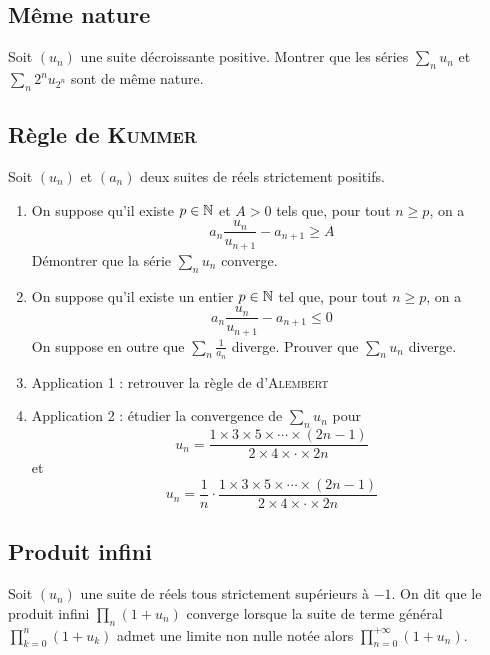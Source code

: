 \subsection{Même nature}

Soit $(u_n)$ une suite décroissante positive. Montrer que les séries $\sum\limits_n u_n$ et $\sum\limits_n 2^n u_{2^n}$ sont de même nature.

\subsection{Règle de \textsc{Kummer}}

Soit $(u_n)$ et $(a_n)$ deux suites de réels strictement positifs.

\begin{enumerate}
    \item On suppose qu'il existe $p\in\mathbb{N}$ et $A>0$ tels que, pour tout $n\geqslant p$, on a 
    \[
        a_n\frac{u_n}{u_{n+1}}-a_{n+1} \geqslant A
    \]
    Démontrer que la série $\sum\limits_n u_n$ converge.
    
    \item On suppose qu'il existe un entier $p\in\mathbb{N}$ tel que, pour tout $n\geqslant p$, on a 
    \[
        a_n\frac{u_n}{u_{n+1}}-a_{n+1} \leqslant 0
    \]
    On suppose en outre que $\sum\limits_n \frac{1}{a_n}$ diverge. Prouver que $\sum\limits_n u_n$ diverge.
    
    \item Application 1 : retrouver la règle de d'\textsc{Alembert}
    
    \item Application 2 : étudier la convergence de $\sum_n u_n$ pour
    \[
        u_n=\frac{1\times 3 \times 5 \times \cdots \times (2n-1)}{2\times 4 \times \cdot \times 2n}
    \]
    et
    \[
        u_n=\frac{1}{n}\cdot \frac{1\times 3 \times 5 \times \cdots \times (2n-1)}{2\times 4 \times \cdot \times 2n}
    \]
    
\end{enumerate}

\subsection{Produit infini}

Soit $(u_n)$ une suite de réels tous strictement supérieurs à $-1$. On dit que le produit infini $\prod\limits_n(1+u_n)$ converge lorsque la suite de terme général $\prod\limits_{k=0}^n(1+u_k)$ admet une limite non nulle notée alors $\prod\limits_{n=0}^{+\infty}(1+u_n)$.

